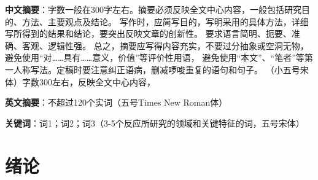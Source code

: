 \documentclass[12pt, a4paper, oneside]{ctexart}
\numberwithin{equation}{section}  %
\begin{document}
\textbf{中文摘要}：字数一般在300字左右。摘要必须反映全文中心内容，一般包括研究目的、方法、主要观点及结论。
写作时，应简写目的，写明采用的具体方法，详细写所得到的结果和结论，要突出反映文章的创新性。
要求语言简明、扼要、准确、客观、逻辑性强。
总之，摘要应写得内容充实，不要过分抽象或空洞无物，避免使用“对……具有……意义，价值”等评价性用语，
避免使用“本文”、“笔者”等第一人称写法。定稿时要注意纠正语病，删减啰唆重复的语句和句子。
（小五号宋体）字数300左右，反映全文中心内容，

\textbf{英文摘要}：不超过120个实词（五号Times New Roman体）

\textbf{关键词}：词1；词2；词3（3-5个反应所研究的领域和关键特征的词，五号宋体）
\clearpage
{}
\thispagestyle{tablestyle}
\tableofcontents %

\clearpage
\setcounter{page}{1}
\section{绪论}
\clearpage
\end{document}
